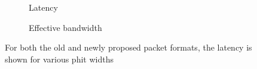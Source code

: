\begin{figure}[htbp]
    \centering
    \begin{subfigure}[b]{0.48\textwidth}
        \begin{adjustbox}{width=\linewidth}
            
        \end{adjustbox}
        \caption{Latency}
    \end{subfigure}
    \hfill
    \begin{subfigure}[b]{0.48\textwidth}
        \begin{adjustbox}{width=\linewidth}
            
        \end{adjustbox}
        \caption{Effective bandwidth}
    \end{subfigure}
    \caption[]{For both the old and newly proposed packet formats, the latency is shown for various phit widths}
    \label{fig:latency_bandwidth_phit_width_packet_format}
\end{figure}
